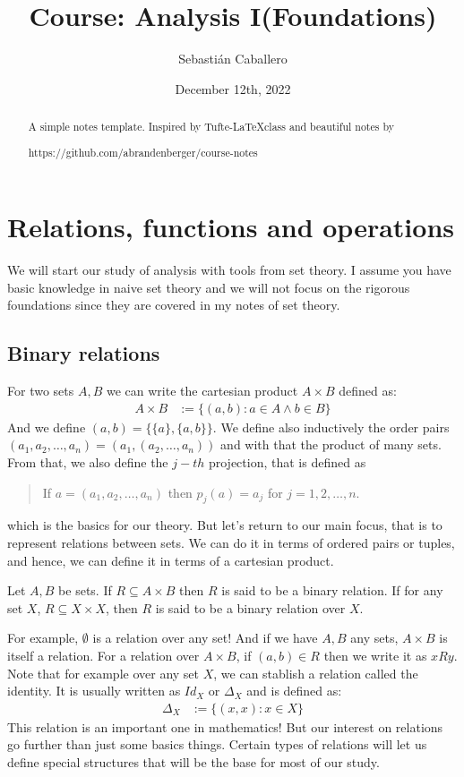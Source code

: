 \documentclass{tufte-handout}
\title{Course: Analysis I(Foundations)}
\author{Sebastián Caballero}
\date{December 12th, 2022}
\begin{document}
\maketitle

\begin{abstract}
\noindent
A simple notes template. Inspired by Tufte-\LaTeX class and beautiful notes by \begin{verbatim*}
	https://github.com/abrandenberger/course-notes
\end{verbatim*}
\end{abstract}

\section{Relations, functions and operations}
We will start our study of analysis with tools from set theory. I assume you have basic knowledge in naive set theory and we will not focus on the rigorous foundations since they are covered in my notes of set theory.

\subsection{Binary relations}
For two sets $A, B$ we can write the cartesian product $A \times B$ defined as:
\begin{align*}
	A \times B &:= \{(a, b): a \in A \wedge b \in B\}
\end{align*}
And we define $(a, b) = \{\{a\}, \{a, b\}\}$. We define also inductively the order pairs $(a_1, a_2, \dots, a_n) = (a_1, (a_2, \dots, a_n))$ and with that the product of many sets. From that, we also define the $j-th$ projection, that is defined as
\begin{quote}
	If $a = (a_1, a_2, \dots, a_n)$ then $p_j(a) = a_j$ for $j = 1, 2, \dots, n$. 
\end{quote}
which is the basics for our theory. But let's return to our main focus, that is to represent relations between sets. We can do it in terms of ordered pairs or tuples, and hence, we can define it in terms of a cartesian product.

\begin{definition}
	Let $A, B$ be sets. If $R \subseteq A \times B$ then $R$ is said to be a binary relation. If for any set $X$, $R \subseteq X \times X$, then $R$ is said to be a binary relation over $X$.
\end{definition}
For example, $\emptyset$ is a relation over any set! And if we have $A, B$ any sets, $A \times B$ is itself a relation. For a relation over $A\times B$, if $(a, b) \in R$ then we write it as $xRy$. Note that for example over any set $X$, we can stablish a relation called the identity. It is usually written as $Id_X$ or $\Delta_X$ and is defined as:
\begin{align*}
	\Delta_X &:= \{(x, x): x \in X\}
\end{align*}
This relation is an important one in mathematics! But our interest on relations go further than just some basics things. Certain types of relations will let us define special structures that will be the base for most of our study.
\end{document}
